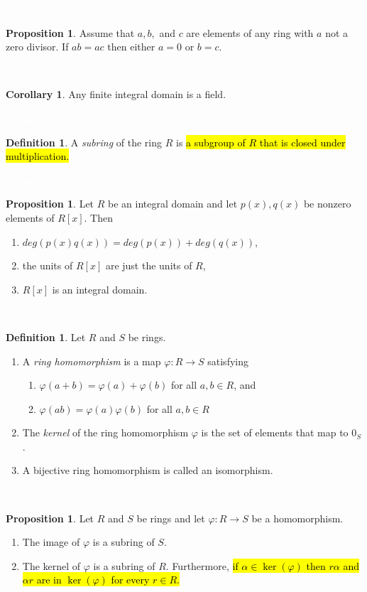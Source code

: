\documentclass{article}
\theoremstyle{definition}
\newtheorem{prop}[thm]{Proposition}
\newtheorem{cor}[thm]{Corollary}
\newtheorem{defn}[thm]{Definition}
\newcommand{\nl}{\textcolor{white}{nothing}}
\newcommand{\ra}{\rightarrow}
\newcommand{\al}{\alpha}
\newcommand{\vphi}{\varphi}
\begin{document}
\nl

\begin{prop}
Assume that $a,b,$ and $c$ are elements of any ring with $a$ not a zero divisor. If $ab=ac$ then either $a=0$ or $b=c$.
\end{prop}

\nl

\begin{cor}
Any finite integral domain is a field.
\end{cor}

\nl

\begin{defn}
A \textit{subring} of the ring $R$ is \hl{a subgroup of $R$ that is closed under multiplication.}
\end{defn}

\nl

\begin{prop}
Let $R$ be an integral domain and let $p(x), q(x)$ be nonzero elements of $R[x]$. Then
\begin{enumerate}
\item $deg(p(x)q(x)) = deg (p(x)) + deg(q(x))$,
\item the units of $R[x]$ are just the units of $R$,
\item $R[x]$ is an integral domain.
\end{enumerate}
\end{prop}

\nl

\begin{defn}
Let $R$ and $S$ be rings.
\begin{enumerate}
\item A \textit{ring homomorphism} is a map $\vphi: R\ra S$ satisfying
\begin{enumerate}
\item $\vphi(a+b) = \vphi(a)+\vphi(b)$ for all $a,b\in R$, and 
\item $\vphi(ab) = \vphi(a)\vphi(b)$ for all $a,b\in R$
\end{enumerate}
\item The \textit{kernel} of the ring homomorphism $\vphi$ is the set of elements that map to $0_S$.
\item A bijective ring homomorphism is called an isomorphism.
\end{enumerate}
\end{defn}

\nl

\begin{prop}
Let $R$ and $S$ be rings and let $\vphi:R\ra S$ be a homomorphism.
\begin{enumerate}
\item The image of $\vphi$ is a subring of $S$.
\item The kernel of $\vphi$ is a subring of $R$. Furthermore, \hl{if $\al\in\ker(\vphi)$ then $r\al$ and $\al r$ are in $\ker(\vphi)$ for every $r\in R$.}
\end{enumerate}
\end{prop}
\end{document}
